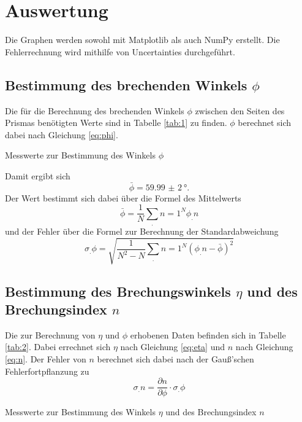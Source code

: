 \section{Auswertung}
\label{sec:Auswertung}


Die Graphen werden sowohl mit Matplotlib \cite{matplotlib} als auch NumPy \cite{numpy} erstellt. Die Fehlerrechnung wird mithilfe von Uncertainties \cite{uncertainties} durchgeführt.
\subsection{Bestimmung des brechenden Winkels $\phi$}

Die für die Berechnung des brechenden Winkels $\phi$ zwischen den Seiten des Prismas benötigten Werte sind in Tabelle \ref{tab:1} zu finden.
$\phi$ berechnet sich dabei nach Gleichung \eqref{eq:phi}.
\begin{table}
	\centering
	\caption{Messwerte zur Bestimmung des Winkels $\phi$}
	
	\label{tab:1}
\end{table}
\noindent
Damit ergibt sich
\[
\bar{\phi} = \SI{59,99(2)}{\degree}\text{.}
\]
Der Wert bestimmt sich dabei über die Formel des Mittelwerts
\[
\bar{\phi} = \frac{1}{N}\sum_.{n=1}^N \phi_.n
\]
und der Fehler über die Formel zur Berechnung der Standardabweichung
\[
\sigma_.{\phi}=\sqrt{\frac{1}{N^2-N}\sum_.n=1^N \left(\phi_.n-\bar{\phi}\right)^2}
\]
\subsection{Bestimmung des Brechungswinkels $\eta$ und des Brechungsindex $n$}
Die zur Berechnung von $\eta$ und $\phi$ erhobenen Daten befinden sich in Tabelle \ref{tab:2}.
Dabei errechnet sich $\eta$ nach Gleichung \eqref{eq:eta} und $n$ nach Gleichung \eqref{eq:n}.
Der Fehler von $n$ berechnet sich dabei nach der Gauß'schen Fehlerfortpflanzung zu
\[
\sigma_.n=\frac{\partial n}{\partial \phi}\cdot \sigma_.{\phi}
\]
\begin{table}
	\centering
	\caption{Messwerte zur Bestimmung des Winkels $\eta$ und des Brechungsindex $n$}
	
	\label{tab:2}
\end{table}

